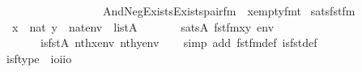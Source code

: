 \begin{isabellebody}
\ \ \ \ \ \ \ \ \ \ \ \ \ \ \ \ \ \ \ And{\isacharparenleft}{\kern0pt}Neg{\isacharparenleft}{\kern0pt}Exists{\isacharparenleft}{\kern0pt}Exists{\isacharparenleft}{\kern0pt}pair{\isacharunderscore}{\kern0pt}fm{\isacharparenleft}{\kern0pt}{}{\isacharcomma}{\kern0pt}{}{\isacharcomma}{\kern0pt}{}\ {\isacharhash}{\kern0pt}{\isacharplus}{\kern0pt}\ x{\isacharparenright}{\kern0pt}{\isacharparenright}{\kern0pt}{\isacharparenright}{\kern0pt}{\isacharparenright}{\kern0pt}{\isacharcomma}{\kern0pt}empty{\isacharunderscore}{\kern0pt}fm{\isacharparenleft}{\kern0pt}t{\isacharparenright}{\kern0pt}{\isacharparenright}{\kern0pt}{\isacharparenright}{\kern0pt}{\isachardoublequoteclose}\isanewline
\isanewline
{}\isamarkupfalse%
\ sats{\isacharunderscore}{\kern0pt}fst{\isacharunderscore}{\kern0pt}fm\ {\isacharcolon}{\kern0pt}\isanewline
\ \ {\isachardoublequoteopen}{\isasymlbrakk}\ x\ {\isasymin}\ nat{\isacharsemicolon}{\kern0pt}\ y\ {\isasymin}\ nat{\isacharsemicolon}{\kern0pt}env\ {\isasymin}\ list{\isacharparenleft}{\kern0pt}A{\isacharparenright}{\kern0pt}\ {\isasymrbrakk}\ \isanewline
\ \ \ \ {\isasymLongrightarrow}\ sats{\isacharparenleft}{\kern0pt}A{\isacharcomma}{\kern0pt}\ fst{\isacharunderscore}{\kern0pt}fm{\isacharparenleft}{\kern0pt}x{\isacharcomma}{\kern0pt}y{\isacharparenright}{\kern0pt}{\isacharcomma}{\kern0pt}\ env{\isacharparenright}{\kern0pt}\ {\isasymlongleftrightarrow}\isanewline
\ \ \ \ \ \ \ \ is{\isacharunderscore}{\kern0pt}fst{\isacharparenleft}{\kern0pt}{\isacharhash}{\kern0pt}{\isacharhash}{\kern0pt}A{\isacharcomma}{\kern0pt}\ nth{\isacharparenleft}{\kern0pt}x{\isacharcomma}{\kern0pt}env{\isacharparenright}{\kern0pt}{\isacharcomma}{\kern0pt}\ nth{\isacharparenleft}{\kern0pt}y{\isacharcomma}{\kern0pt}env{\isacharparenright}{\kern0pt}{\isacharparenright}{\kern0pt}{\isachardoublequoteclose}\isanewline
%
\isadelimproof
\ \ %
\endisadelimproof
%
\isatagproof
{}\isamarkupfalse%
\ {\isacharparenleft}{\kern0pt}simp\ add{\isacharcolon}{\kern0pt}\ fst{\isacharunderscore}{\kern0pt}fm{\isacharunderscore}{\kern0pt}def\ is{\isacharunderscore}{\kern0pt}fst{\isacharunderscore}{\kern0pt}def{\isacharparenright}{\kern0pt}%
\endisatagproof
{\isafoldproof}%
%
\isadelimproof
\isanewline
%
\endisadelimproof
\isanewline
{}\isamarkupfalse%
\ \isanewline
\ \ is{\isacharunderscore}{\kern0pt}ftype\ {\isacharcolon}{\kern0pt}{\isacharcolon}{\kern0pt}\ {\isachardoublequoteopen}{\isacharparenleft}{\kern0pt}i{\isasymRightarrow}o{\isacharparenright}{\kern0pt}{\isasymRightarrow}i{\isasymRightarrow}i{\isasymRightarrow}o{\isachardoublequoteclose}\ \isanewline

\end{isabellebody}
